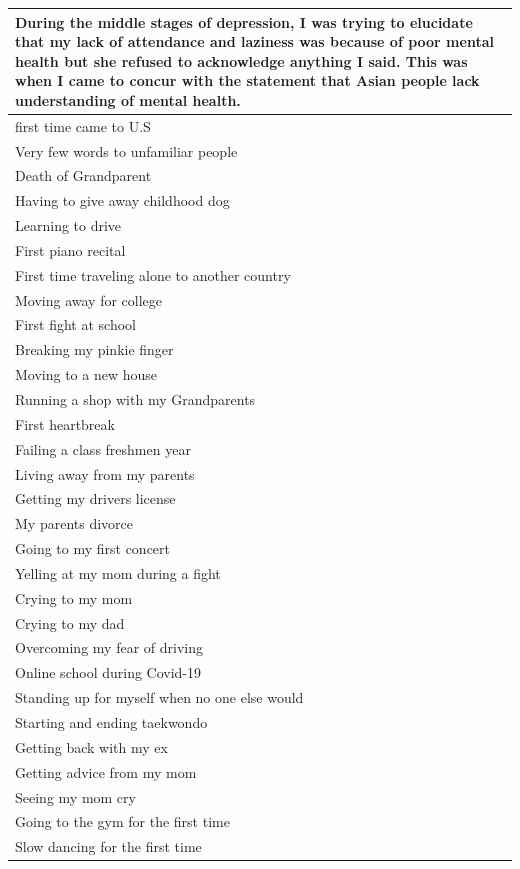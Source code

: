 \documentclass[
  .7em,
  letterpaper,
  DIV=11,
  numbers=noendperiod]{scrartcl}
\begin{document}
\begin{table}
\begin{tabular}{l}
\hline
During the middle stages of depression, I was trying to elucidate that my lack of attendance and laziness was because of poor mental health but she refused to acknowledge anything I said. This was when I came to concur with the statement that Asian people lack understanding of mental health.\\
\hline
first time came to U.S\\
\hline
Very few words to unfamiliar people\\
\hline
Death of Grandparent\\
\hline
Having to give away childhood dog\\
\hline
Learning to drive\\
\hline
First piano recital\\
\hline
First time traveling alone to another country\\
\hline
Moving away for college\\
\hline
First fight at school\\
\hline
Breaking my pinkie finger\\
\hline
Moving to a new house\\
\hline
Running a shop with my Grandparents\\
\hline
First heartbreak\\
\hline
Failing a class freshmen year\\
\hline
Living away from my parents\\
\hline
Getting my drivers license\\
\hline
My parents divorce\\
\hline
Going to my first concert\\
\hline
Yelling at my mom during a fight\\
\hline
Crying to my mom\\
\hline
Crying to my dad\\
\hline
Overcoming my fear of driving\\
\hline
Online school during Covid-19\\
\hline
Standing up for myself when no one else would\\
\hline
Starting and ending taekwondo\\
\hline
Getting back with my ex\\
\hline
Getting advice from my mom\\
\hline
Seeing my mom cry\\
\hline
Going to the gym for the first time\\
\hline
Slow dancing for the first time\\

\end{tabular}
\end{table}
\end{document}
